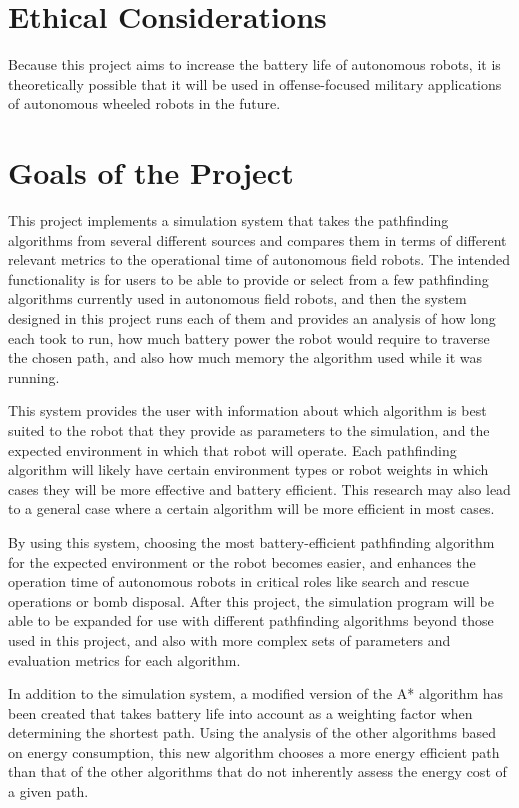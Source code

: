 \section{Ethical Considerations}
\label{sec:ethics}
Because this project aims to increase the battery life of autonomous robots, it is theoretically possible that it will be used in offense-focused military applications of autonomous wheeled robots in the future.

\section{Goals of the Project}
\label{sec:goals}
This project implements a simulation system that takes the pathfinding algorithms from several different sources and compares them in terms of different relevant metrics to the operational time of autonomous field robots. The intended functionality is for users to be able to provide or select from a few pathfinding algorithms currently used in autonomous field robots, and then the system designed in this project runs each of them and provides an analysis of how long each took to run, how much battery power the robot would require to traverse the chosen path, and also how much memory the algorithm used while it was running.
\par
This system provides the user with information about which algorithm is best suited to the robot that they provide as parameters to the simulation, and the expected environment in which that robot will operate. Each pathfinding algorithm will likely have certain environment types or robot weights in which cases they will be more effective and battery efficient. This research may also lead to a general case where a certain algorithm will be more efficient in most cases.
\par
By using this system, choosing the most battery-efficient pathfinding algorithm for the expected environment or the robot becomes easier, and enhances the operation time of autonomous robots in critical roles like search and rescue operations or bomb disposal. After this project, the simulation program will be able to be expanded for use with different pathfinding algorithms beyond those used in this project, and also with more complex sets of parameters and evaluation metrics for each algorithm.
\par
In addition to the simulation system, a modified version of the A* algorithm has been created that takes battery life into account as a weighting factor when determining the shortest path. Using the analysis of the other algorithms based on energy consumption, this new algorithm chooses a more energy efficient path than that of the other algorithms that do not inherently assess the energy cost of a given path. 

